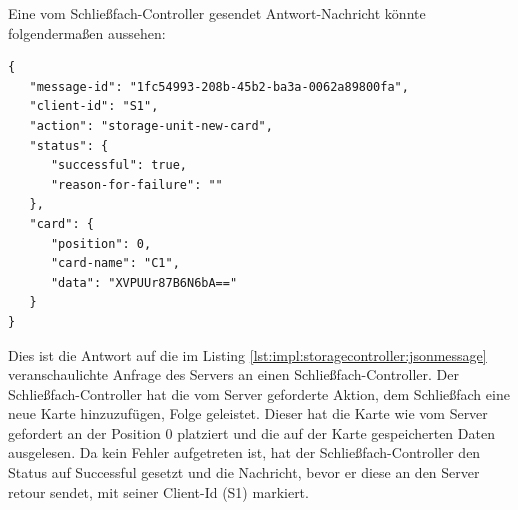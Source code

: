 Eine vom Schließfach-Controller gesendet Antwort-Nachricht könnte folgendermaßen aussehen:
\begin{lstlisting}[style=goMono,label={lst:impl:storagecontroller:jsonmessage:response},caption={\centering Antwort: Ausformulierte JSON-Repräsentation eines Karten-Nachricht Objektes mit Header, Status und Card}]
{
   "message-id": "1fc54993-208b-45b2-ba3a-0062a89800fa",
   "client-id": "S1",   
   "action": "storage-unit-new-card",
   "status": {
      "successful": true,
      "reason-for-failure": ""
   },
   "card": {
      "position": 0,
      "card-name": "C1",
      "data": "XVPUUr87B6N6bA=="
   }
}
\end{lstlisting}
Dies ist die Antwort auf die im Listing \ref{lst:impl:storagecontroller:jsonmessage} veranschaulichte Anfrage des Servers an einen Schließfach-Controller. Der Schließfach-Controller hat die vom Server geforderte Aktion, dem Schließfach eine neue Karte hinzuzufügen, Folge geleistet. Dieser hat die Karte wie vom Server gefordert an der Position 0 platziert und die auf der Karte gespeicherten Daten ausgelesen. Da kein Fehler aufgetreten ist, hat der Schließfach-Controller den Status auf Successful gesetzt und die Nachricht, bevor er diese an den Server retour sendet, mit seiner Client-Id (S1) markiert.  

